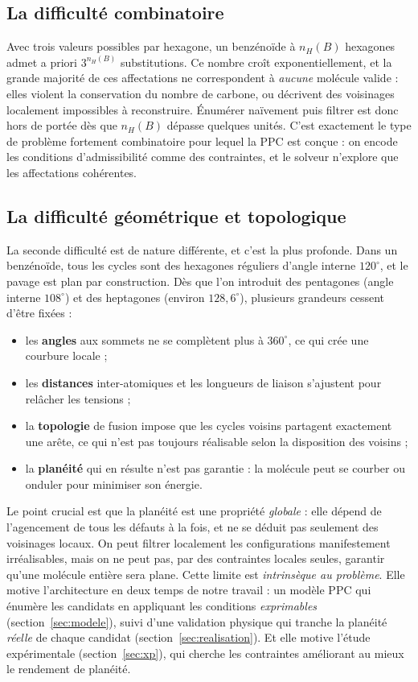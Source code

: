 \documentclass[11pt,a4paper]{article}
\begin{document}
\subsection{La difficulté combinatoire}

Avec trois valeurs possibles par hexagone, un benzénoïde à $n_H(B)$
hexagones admet a priori $3^{n_H(B)}$ substitutions. Ce nombre croît
exponentiellement, et la grande majorité de ces affectations ne
correspondent à \emph{aucune} molécule valide : elles violent la
conservation du nombre de carbone, ou décrivent des voisinages localement
impossibles à reconstruire. Énumérer naïvement puis filtrer est donc
hors de portée dès que $n_H(B)$ dépasse quelques unités. C'est exactement le type de
problème fortement combinatoire pour lequel la PPC est conçue : on encode les
conditions d'admissibilité comme des contraintes, et le solveur n'explore que
les affectations cohérentes.

\subsection{La difficulté géométrique et topologique}

La seconde difficulté est de nature différente, et c'est la plus profonde. Dans
un benzénoïde, tous les cycles sont des hexagones réguliers d'angle interne
$120^\circ$, et le pavage est plan par construction. Dès que l'on introduit des
pentagones (angle interne $108^\circ$) et des heptagones (environ $128{,}6^\circ$),
plusieurs grandeurs cessent d'être fixées :

\begin{itemize}[leftmargin=1.4em]
  \item les \textbf{angles} aux sommets ne se complètent plus à $360^\circ$, ce
    qui crée une courbure locale ;
  \item les \textbf{distances} inter-atomiques et les longueurs de liaison
    s'ajustent pour relâcher les tensions ;
  \item la \textbf{topologie} de fusion impose que les cycles voisins partagent
    exactement une arête, ce qui n'est pas toujours réalisable selon la
    disposition des voisins ;
  \item la \textbf{planéité} qui en résulte n'est pas garantie : la molécule peut
    se courber ou onduler pour minimiser son énergie.
\end{itemize}

Le point crucial est que la planéité est une propriété \emph{globale} : elle
dépend de l'agencement de tous les défauts à la fois, et ne se déduit pas
seulement des voisinages locaux. On peut filtrer localement les configurations
manifestement irréalisables, mais on ne peut pas, par des contraintes locales
seules, garantir qu'une molécule entière sera plane. Cette limite est
\emph{intrinsèque au problème}. Elle motive l'architecture en deux temps de notre
travail : un modèle PPC qui énumère les candidats en appliquant les conditions
\emph{exprimables} (section~\ref{sec:modele}), suivi d'une validation physique
qui tranche la planéité \emph{réelle} de chaque candidat
(section~\ref{sec:realisation}). Et elle motive l'étude expérimentale
(section~\ref{sec:xp}), qui cherche les contraintes améliorant au mieux le
rendement de planéité.
\end{document}

